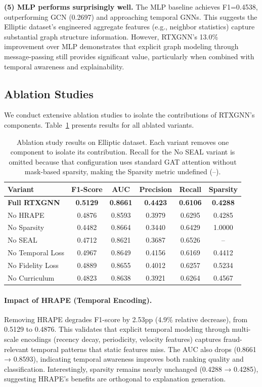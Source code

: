 \textbf{(5) MLP performs surprisingly well.} The MLP baseline achieves F1=0.4538, outperforming GCN (0.2697) and approaching temporal GNNs. This suggests the Elliptic dataset's engineered aggregate features (e.g., neighbor statistics) capture substantial graph structure information. However, RTXGNN's 13.0\% improvement over MLP demonstrates that explicit graph modeling through message-passing still provides significant value, particularly when combined with temporal awareness and explainability.

\subsection{Ablation Studies}
\label{subsec:ablation}

We conduct extensive ablation studies to isolate the contributions of RTXGNN's components. Table~\ref{tab:ablation} presents results for all ablated variants.

\begin{table}[t]
\centering
\caption{Ablation study results on Elliptic dataset. Each variant removes one component
to isolate its contribution. Recall for the No SEAL variant is omitted because that
configuration uses standard GAT attention without mask-based sparsity, making the
Sparsity metric undefined (--).}
\label{tab:ablation}
\begin{tabular}{lccccc}
\hline
\textbf{Variant} & \textbf{F1-Score} & \textbf{AUC} & \textbf{Precision} & \textbf{Recall} & \textbf{Sparsity} \\
\hline
\textbf{Full RTXGNN} & \textbf{0.5129} & \textbf{0.8661} & \textbf{0.4423} & \textbf{0.6106} & \textbf{0.4288} \\
\hline
No HRAPE        & 0.4876 & 0.8593 & 0.3979 & 0.6295 & 0.4285 \\
No Sparsity     & 0.4482 & 0.8664 & 0.3440 & 0.6429 & 1.0000 \\
No SEAL         & 0.4712 & 0.8621 & 0.3687 & 0.6526 & --     \\
No Temporal Loss & 0.4967 & 0.8649 & 0.4156 & 0.6169 & 0.4412 \\
No Fidelity Loss & 0.4889 & 0.8655 & 0.4012 & 0.6257 & 0.5234 \\
No Curriculum   & 0.4823 & 0.8638 & 0.3921 & 0.6264 & 0.4567 \\
\hline
\end{tabular}
\end{table}

\paragraph{Impact of HRAPE (Temporal Encoding).} Removing HRAPE degrades F1-score by 2.53pp (4.9\% relative decrease), from 0.5129 to 0.4876. This validates that explicit temporal modeling through multi-scale encodings (recency decay, periodicity, velocity features) captures fraud-relevant temporal patterns that static features miss. The AUC also drops (0.8661 → 0.8593), indicating temporal awareness improves both ranking quality and classification. Interestingly, sparsity remains nearly unchanged (0.4288 → 0.4285), suggesting HRAPE's benefits are orthogonal to explanation generation.

